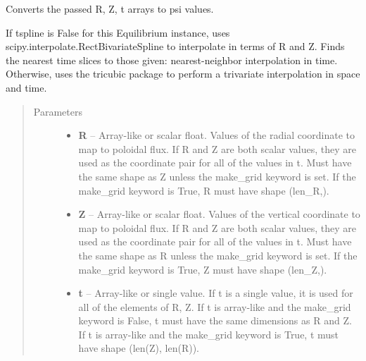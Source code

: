 \documentclass[letterpaper,10pt,english]{sphinxmanual}
\begin{document}
\begin{fulllineitems}
\begin{fulllineitems}
\begin{quote}
\begin{description}
\end{description}\end{quote}

\end{fulllineitems}


\begin{fulllineitems}
\label{eqtools:eqtools.core.Equilibrium.rz2psi}
Converts the passed R, Z, t arrays to psi values.

If tspline is False for this Equilibrium instance, uses
scipy.interpolate.RectBivariateSpline to interpolate in terms of R and
Z. Finds the nearest time slices to those given: nearest-neighbor
interpolation in time. Otherwise, uses the tricubic package to perform
a trivariate interpolation in space and time.
\begin{quote}\begin{description}
\item[{Parameters }] \leavevmode\begin{itemize}
\item {} 
\textbf{R} --
Array-like or scalar float.
Values of the radial coordinate to
map to poloidal flux. If R and Z are both scalar values, they
are used as the coordinate pair for all of the values in t.
Must have the same shape as Z unless the make\_grid keyword is
set. If the make\_grid keyword is True, R must have shape (len\_R,).

\item {} 
\textbf{Z} --
Array-like or scalar float.
Values of the vertical coordinate to
map to poloidal flux. If R and Z are both scalar values, they
are used as the coordinate pair for all of the values in t.
Must have the same shape as R unless the make\_grid keyword is
set. If the make\_grid keyword is True, Z must have shape (len\_Z,).

\item {} 
\textbf{t} --
Array-like or single value.
If t is a single value, it is used
for all of the elements of R, Z. If t is array-like and the
make\_grid keyword is False, t must have the same dimensions as
R and Z. If t is array-like and the make\_grid keyword is True,
t must have shape (len(Z), len(R)).

\end{itemize}


\end{description}
\end{quote}
\end{fulllineitems}
\end{fulllineitems}
\end{document}
